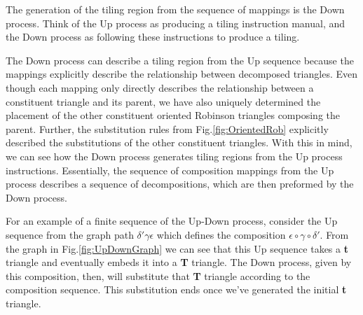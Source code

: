 \documentclass[
  oneside,
  11pt, a4paper,
  footinclude=true,
  headinclude=true,
  cleardoublepage=empty
]{scrbook}
\begin{document}
The generation of the tiling region from the sequence of mappings is the Down process. Think of the Up process as producing a tiling instruction manual, and the Down process as following these instructions to produce a tiling. 

The Down process can describe a tiling region from the Up sequence because the mappings explicitly describe the relationship between decomposed triangles. Even though each mapping only directly describes the relationship between a constituent triangle and its parent, we have also uniquely determined the placement of the other constituent oriented Robinson triangles composing the parent. Further, the substitution rules from Fig.\ref{fig:OrientedRob} explicitly described the substitutions of the other constituent triangles. With this in mind, we can see how the Down process generates tiling regions from the Up process instructions. Essentially, the sequence of composition mappings from the Up process describes a sequence of decompositions, which are then preformed by the Down process.

For an example of a finite sequence of the Up-Down process, consider the Up sequence from the graph path $\delta'\gamma\epsilon$ which defines the composition $\epsilon \circ \gamma \circ \delta'$. From the graph in Fig.\ref{fig:UpDownGraph} we can see that this Up sequence takes a \textbf{t} triangle and eventually embeds it into a \textbf{T} triangle. The Down process, given by this composition, then, will substitute that \textbf{T} triangle according to the composition sequence. This substitution ends once we've generated the initial \textbf{t} triangle. 
\end{document}
